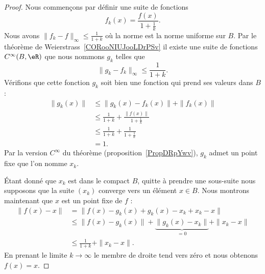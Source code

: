 \begin{proof}
    Nous commençons par définir une suite de fonctions
    \begin{equation}
        f_k(x)=\frac{ f(x) }{ 1+\frac{1}{ k } }.
    \end{equation}
    Nous avons \( \| f_k-f \|_{\infty}\leq \frac{1}{ 1+k }\) où la norme est la norme uniforme sur \( B\). Par le théorème de Weierstrass~\ref{CORooNIUJooLDrPSv} il existe une suite de fonctions \(  C^{\infty}(B,\eR)\) que nous nommons \( g_k\) telles que
    \begin{equation}
        \|  g_k-f_k\|_{\infty}\leq\frac{1}{ 1+k }.
    \end{equation}
    Vérifions que cette fonction \( g_k\) soit bien une fonction qui prend ses valeurs dans \( B\) :
    \begin{subequations}
        \begin{align}
            \| g_k(x) \|&\leq \| g_k(x)-f_k(x) \|+\| f_k(x) \|\\
            &\leq \frac{1}{ 1+k }+\frac{ \| f(x) \| }{ 1+\frac{1}{ k } }\\
            &\leq \frac{1}{ 1+k}+\frac{1}{ 1+\frac{1}{ k } }\\
            &=1.
        \end{align}
    \end{subequations}
    Par la version \(  C^{\infty}\) du théorème (proposition~\ref{PropDRpYwv}), \( g_k\) admet un point fixe que l'on nomme \( x_k\).

    Étant donné que \( x_k\) est dans le compact \( B\), quitte à prendre une sous-suite nous supposons que la suite \( (x_k)\) converge vers un élément \( x\in B\). Nous montrons maintenant que \( x\) est un point fixe de \( f\) :
    \begin{subequations}
        \begin{align}
            \| f(x)-x \|&=\| f(x)-g_k(x)+g_k(x)-x_k+x_k-x \|\\
            &\leq \| f(x)-g_k(x) \| +\underbrace{\| g_k(x)-x_k \|}_{=0}+\| x_k-x \|\\
            &\leq \frac{1}{ 1+k }+\| x_k-x \|.
        \end{align}
    \end{subequations}
    En prenant le limite \( k\to\infty\) le membre de droite tend vers zéro et nous obtenons \( f(x)=x\).
\end{proof}

